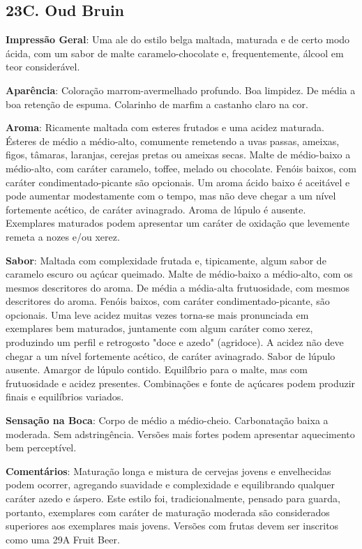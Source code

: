 \subsection*{23C. Oud Bruin}
\textbf{Impressão Geral}: Uma ale do estilo belga maltada, maturada e de certo modo ácida, com um sabor de malte caramelo-chocolate e, frequentemente, álcool em teor considerável.

\textbf{Aparência}: Coloração marrom-avermelhado profundo. Boa limpidez. De média a boa retenção de espuma. Colarinho de marfim a castanho claro na cor.

\textbf{Aroma}: Ricamente maltada com esteres frutados e uma acidez maturada. Ésteres de médio a médio-alto, comumente remetendo a uvas passas, ameixas, figos, tâmaras, laranjas, cerejas pretas ou ameixas secas. Malte de médio-baixo a médio-alto, com caráter caramelo, toffee, melado ou chocolate. Fenóis baixos, com caráter condimentado-picante são opcionais. Um aroma ácido baixo é aceitável e pode aumentar modestamente com o tempo, mas não deve chegar a um nível fortemente acético, de caráter avinagrado. Aroma de lúpulo é ausente. Exemplares maturados podem apresentar um caráter de oxidação que levemente remeta a nozes e/ou xerez.

\textbf{Sabor}: Maltada com complexidade frutada e, tipicamente, algum sabor de caramelo escuro ou açúcar queimado. Malte de médio-baixo a médio-alto, com os mesmos descritores do aroma. De média a média-alta frutuosidade, com mesmos descritores do aroma. Fenóis baixos, com caráter condimentado-picante, são opcionais. Uma leve acidez muitas vezes torna-se mais pronunciada em exemplares bem maturados, juntamente com algum caráter como xerez, produzindo um perfil e retrogosto "doce e azedo" (agridoce). A acidez não deve chegar a um nível fortemente acético, de caráter avinagrado. Sabor de lúpulo ausente. Amargor de lúpulo contido. Equilíbrio para o malte, mas com frutuosidade e acidez presentes. Combinações e fonte de açúcares podem produzir finais e equilíbrios variados.

\textbf{Sensação na Boca}: Corpo de médio a médio-cheio. Carbonatação baixa a moderada. Sem adstringência. Versões mais fortes podem apresentar aquecimento bem perceptível.

\textbf{Comentários}: Maturação longa e mistura de cervejas jovens e envelhecidas podem ocorrer, agregando suavidade e complexidade e equilibrando qualquer caráter azedo e áspero. Este estilo foi, tradicionalmente, pensado para guarda, portanto, exemplares com caráter de maturação moderada são considerados superiores aos exemplares mais jovens. Versões com frutas devem ser inscritos como uma 29A Fruit Beer.

